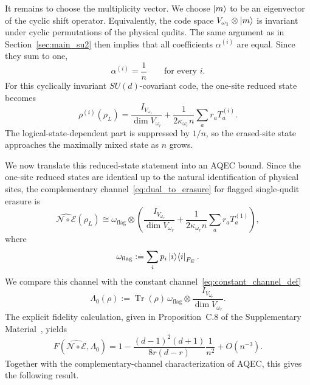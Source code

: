 \documentclass[10pt,twocolumn,superscriptaddress,aps,amsmath,amssymb,citeautoscript,floatfix,prx,longbibliography]{revtex4-2}
\theoremstyle{plain}
\theoremstyle{plain}
\theoremstyle{plain}
\theoremstyle{plain}
\theoremstyle{plain}
\theoremstyle{plain}
\begin{document}
It remains to choose the multiplicity vector. We choose $\ket m$ to be an eigenvector of the cyclic shift operator. Equivalently, the code space $V_{\omega_1}\otimes\ket m$ is invariant under cyclic permutations of the physical qudits. The same argument as in Section~\ref{sec:main_su2} then implies that all coefficients $\alpha^{(i)}$ are equal. Since they sum to one,
$$
    \alpha^{(i)}=\frac1n
    \qquad
    \text{for every } i .
$$
For this cyclically invariant $SU(d)$-covariant code, the one-site reduced state becomes
$$
    \rho^{(i)}(\rho_L)
    =
    \frac{I_{V_{\omega_r}}}{\dim V_{\omega_r}}
    +
    \frac{1}{2\kappa_{\omega_r}n}
    \sum_a r_a T_a^{(i)} .
$$
The logical-state-dependent part is suppressed by $1/n$, so the erased-site state approaches the maximally mixed state as $n$ grows.

We now translate this reduced-state statement into an AQEC bound. Since the one-site reduced states are identical up to the natural identification of physical sites, the complementary channel~\eqref{eq:dual_to_erasure} for flagged single-qudit erasure is
$$
    \widehat{\mathcal N\circ\mathcal E}(\rho_L)
    \cong
    \omega_{\mathrm{flag}}
    \otimes
    \left(
    \frac{I_{V_{\omega_r}}}{\dim V_{\omega_r}}
    +
    \frac{1}{2\kappa_{\omega_r}n}
    \sum_a r_a T_a^{(1)}
    \right),
$$
where
$$
    \omega_{\mathrm{flag}}
    :=
    \sum_i p_i\ket i\!\bra i_{F_E}.
$$
We compare this channel with the constant channel~\eqref{eq:constant_channel_def}
$$
    \Lambda_0(\rho)
    :=
    \operatorname{Tr}(\rho)\,
    \omega_{\mathrm{flag}}
    \otimes
    \frac{I_{V_{\omega_r}}}{\dim V_{\omega_r}} .
$$
The explicit fidelity calculation, given in Proposition~C.8 of the Supplementary Material~\cite{SuppMat}, yields
\begin{equation}\label{eq:fidelity_sud}
    F\left(\widehat{\mathcal N\circ\mathcal E},\Lambda_0\right)
    =
    1
    -
    \frac{(d-1)^2(d+1)}{8r(d-r)}
    \frac{1}{n^2}
    +
    O(n^{-3}) .
\end{equation}
Together with the complementary-channel characterization of AQEC, this gives the following result.
\end{document}

